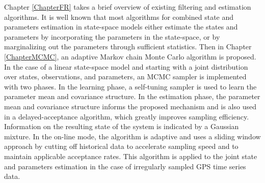 Chapter \ref{ChapterFR} takes a brief overview of existing filtering and estimation algorithms. It is well known that most algorithms for combined state and parameters estimation in state-space models either estimate the states and parameters by incorporating the parameters in the state-space, or by marginalizing out the parameters through sufficient statistics. Then in Chapter \ref{ChapterMCMC}, an adaptive Markov chain Monte Carlo algorithm is proposed. In the case of a linear state-space model and starting with a joint distribution over states, observations, and parameters, an MCMC sampler is implemented with two phases. In the learning phase, a self-tuning sampler is used to learn the parameter mean and covariance structure. In the estimation phase, the parameter mean and covariance structure informs the proposed mechanism and is also used in a delayed-acceptance algorithm, which greatly improves sampling efficiency. Information on the resulting state of the system is indicated by a Gaussian mixture. In the on-line mode, the algorithm is adaptive and uses a sliding window approach by cutting off historical data to accelerate sampling speed and to maintain applicable acceptance rates. This algorithm is applied to the joint state and parameters estimation in the case of irregularly sampled GPS time series data. 
